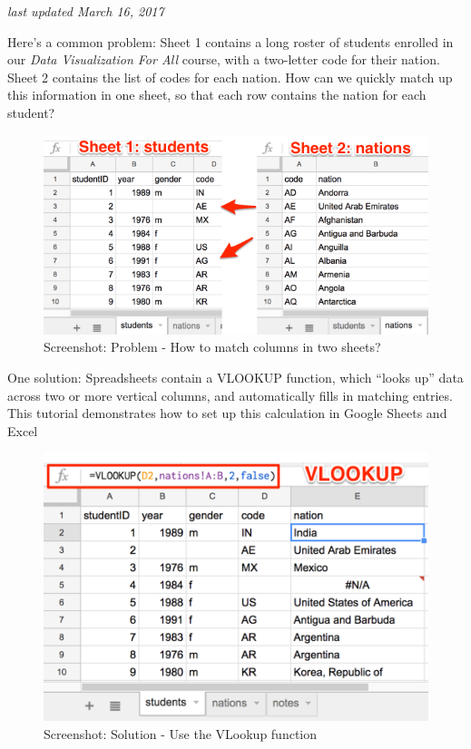 \documentclass[
  english,
]{book}
\begin{document}
\emph{last updated March 16, 2017}

Here's a common problem: Sheet 1 contains a long roster of students enrolled in our \emph{Data Visualization For All} course, with a two-letter code for their nation. Sheet 2 contains the list of codes for each nation. How can we quickly match up this information in one sheet, so that each row contains the nation for each student?

\begin{figure}
\centering
\includegraphics{images/02-spreadsheet/vlookup-problem.png}
\caption{Screenshot: Problem - How to match columns in two sheets?}
\end{figure}

One solution: Spreadsheets contain a VLOOKUP function, which ``looks up'' data across two or more vertical columns, and automatically fills in matching entries. This tutorial demonstrates how to set up this calculation in Google Sheets and Excel

\begin{figure}
\centering
\includegraphics{images/02-spreadsheet/vlookup-solution.png}
\caption{Screenshot: Solution - Use the VLookup function}
\end{figure}
\end{document}
